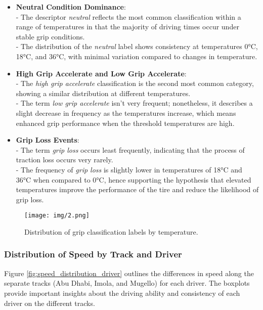 \documentclass[a4paper,final,12pt]{report}
\begin{document}
\begin{itemize}
    \item \textbf{Neutral Condition Dominance}:\\
    - The descriptor \textit{neutral} reflects the most common classification within a range of temperatures in that the majority of driving times occur under stable grip conditions.\\
    - The distribution of the \textit{neutral} label shows consistency at temperatures 0°C, 18°C, and 36°C, with minimal variation compared to changes in temperature.

    \item \textbf{High Grip Accelerate and Low Grip Accelerate}:\\
    - The \textit{high grip accelerate} classification is the second most common category, showing a similar distribution at different temperatures.\\
    - The term \textit{low grip accelerate} isn't very frequent; nonetheless, it describes a slight decrease in frequency as the temperatures increase, which means enhanced grip performance when the threshold temperatures are high.

    \item \textbf{Grip Loss Events}:\\
    - The term \textit{grip loss} occurs least frequently, indicating that the process of traction loss occurs very rarely.\\
    - The frequency of \textit{grip loss} is slightly lower in temperatures of 18°C and 36°C when compared to 0°C, hence supporting the hypothesis that elevated temperatures improve the performance of the tire and reduce the likelihood of grip loss.
\end{itemize}

\begin{figure}[H]
    \centering
    \texttt{[image: img/2.png]}
    \caption{Distribution of grip classification labels by temperature.}
    \label{fig:label_distribution_temperature}
\end{figure}

\subsubsection{Distribution of Speed by Track and Driver}
Figure \ref{fig:speed_distribution_driver} outlines the differences in speed along the separate tracks (Abu Dhabi, Imola, and Mugello) for each driver. The boxplots provide important insights about the driving ability and consistency of each driver on the different tracks.
\end{document}
